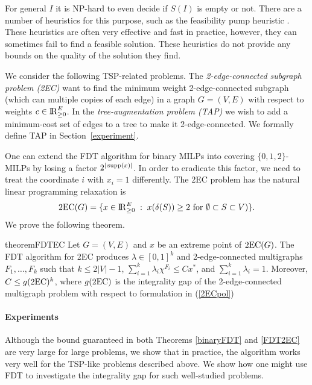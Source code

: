 For general $I$ it is NP-hard to even decide if $S(I)$ is empty or not. There are a number of heuristics for this purpose, such as the feasibility pump heuristic \cite{fp1,fp2}. These heuristics are often very effective and fast in practice, however, they can sometimes fail to find a feasible solution. These heuristics do not provide any bounds on the quality of the solution they find. 

We consider the following TSP-related problems.  The {\em 2-edge-connected subgraph problem (2EC)} want to find the minimum weight 2-edge-connected subgraph (which can multiple copies of each edge) in a graph $G=(V,E)$ with respect to weights $c\in {\rm I\!R}^E_{\geq 0}$. In the {\em tree-augmentation problem (TAP)} we wish to add a minimum-cost set of edges to a tree to make it 2-edge-connected.  We formally define TAP in Section~\ref{experiment}.

One can extend the FDT algorithm for binary MILPs into covering $\{0,1,2\}$-MILPs by losing a factor $2^{|\operatorname{supp}(x)|}$. In order to eradicate this factor, we need to treat the coordinate $i$ with $x_i=1$ differently. The 2EC problem has the natural linear programming relaxation is
\begin{equation}\label{2ECpol}
\operatorname{2EC}(G)= \{x\in {\rm I\!R}_{\geq 0}^{E}\;:\; x(\delta(S))\geq 2 \text{ for $\emptyset \subset S\subset V$})\}.\end{equation}
We prove the following theorem.

\begin{restatable}{theorem}{FDTEC}
	\label{FDT2EC}
	Let $G=(V,E)$ and $x$ be an extreme point of  $\operatorname{2EC}(G)$. The FDT algorithm for 2EC produces $\lambda\in [0,1]^k$ and 2-edge-connected multigraphs $F_1,\ldots,F_k$ such that $k\leq 2|V|-1$, $\sum_{i=1}^{k}\lambda_i \chi^{F_i}\leq Cx^*$, and $\sum_{i=1}^{k}\lambda_i = 1$. Moreover, $C\leq g({\operatorname{2EC}})^{k}$, where $g({\operatorname{2EC}})$ is the integrality gap of the 2-edge-connected multigraph problem with respect to formulation in (\ref{2ECpol}) 
\end{restatable}

\paragraph{Experiments} Although the bound guaranteed in both Theorems \ref{binaryFDT} and \ref{FDT2EC} are very large for large problems, we show that in practice, the algorithm works very well for the TSP-like problems described above. We show how one might use FDT to investigate the integrality gap for such well-studied problems.

